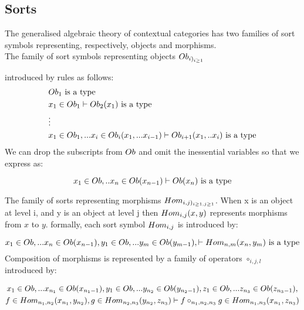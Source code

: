\documentclass[10pt,a4paper]{article}
\begin{document}
\subsection*{Sorts}
The generalised algebraic theory of contextual categories has two families of sort symbols representing, respectively,  objects and morphisms. \\

\noindent The family of sort symbols representing 
objects $Ob_{i)_{i\geq 1}}$ 


introduced by 
rules as follows: 
\begin{align*}
&Ob_1\mbox{ is a type} \\
&x_1 \in Ob_1 \vdash Ob_2(x_1)\mbox{ is a type} \\
& \vdots \\
&x_1 \in Ob_1,... x_{i} \in Ob_{i}(x_1,...x_{i-1}) \vdash Ob_{i+1}(x_1, ..x_{i})\mbox{ is a type} \\
\end{align*}
\noindent We can drop the subscripts from $Ob$ and omit the inessential variables so that we express as:

\begin{equation}
x_1 \in Ob,.. x_{n} \in Ob(x_{n-1}) \vdash Ob(x_{n})\mbox{ is a type} \\
\end{equation}
\vspace{0cm}

\noindent The family of sorts representing morphisms
$Hom_{i,j)_{i\geq 1,j\geq1}}$. 
When x is an object at level i, and y is an object at level j then $Hom_{i,j}(x,y)$ represents morphisms from $x$ to $y$. 
formally, each sort symbol $Hom_{i,j}$ is introduced by:

\begin{equation}
\label{sortintroterm}
x_1 \in Ob,... x_{n} \in Ob(x_{n-1}), y_1 \in Ob,... y_{m} \in Ob(y_{m-1}),
\vdash Hom_{n,m}(x_n,y_m)\mbox{ is a type}
 \\
\end{equation}
\noindent Composition of morphisms is represented by a family of operators $\circ_{i,j,l}$ introduced by:

\begin{multline}
\label{compositionintro}
x_1 \in Ob,... x_{{n_1}} \in Ob(x_{{n_1}-1}), y_1 \in Ob,... y_{{n_2}} \in Ob(y_{{n_2}-1}),z_1 \in Ob,... z_{{n_3}} \in Ob(z_{{n_3}-1}), \\
f \in Hom_{{n_1},{n_2}}(x_{n_1},y_{n_2}), g \in Hom_{{n_2},{n_3}}(y_{n_2},z_{n_3})
\vdash f \circ_{{n_1},{n_2},{n_3}} g \in Hom_{{n_1},{n_3}}(x_{n_1},z_{n_3})
\end{multline}
\end{document}
